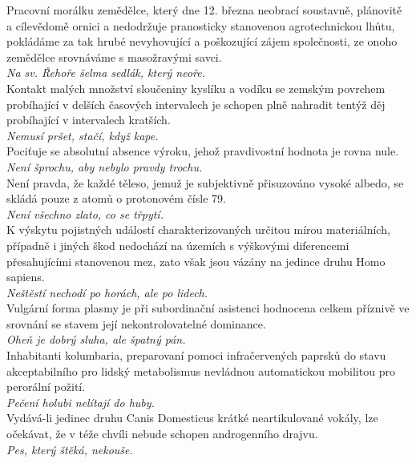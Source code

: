 \begin{multicols}{2}
\noindent
Pracovní morálku zemědělce, který dne 12. března neobrací
soustavně, plánovitě a cílevědomě ornici a nedodržuje pranosticky
stanovenou agrotechnickou lhůtu, pokládáme za tak hrubé nevyhovující
a poškozující zájem společnosti, ze onoho zemědělce srovnáváme
s masožravými savci.\\[1 mm]
{\sl Na sv. Řehoře šelma sedlák, který neoře.}\\

\noindent
Kontakt malých množství sloučeniny kyslíku a vodíku se zemským
povrchem probíhající v delších časových intervalech je schopen
plně nahradit tentýž děj probíhající v intervalech kratších.\\[1 mm]
{\sl Nemusí pršet, stačí, když kape.}\\

\noindent
Pociťuje se absolutní absence výroku, jehož pravdivostní
hodnota je rovna nule.\\[1 mm]
{\sl Není šprochu, aby nebylo pravdy trochu.}\\

\noindent
Není pravda, že každé těleso, jemuž je subjektivně přisuzováno
vysoké albedo, se skládá pouze z atomů o protonovém čísle 79.\\[1 mm]
{\sl Není všechno zlato, co se třpytí.}\\

\noindent
K výskytu pojistných událostí charakterizovaných určitou
mírou materiálních, případně i jiných škod nedochází na územích
s výškovými diferencemi přesahujícími stanovenou mez, zato však
jsou vázány na jedince druhu Homo sapiens.\\[1 mm]
{\sl Neštěstí nechodí po horách, ale po lidech.}\\

\noindent
Vulgární forma plasmy je při subordinační asistenci hodnocena
celkem příznivě ve srovnání se stavem její nekontrolovatelné
dominance.\\[1 mm]
{\sl Oheň je dobrý sluha, ale špatný pán.}\\

\noindent
Inhabitanti kolumbaria, preparovaní pomoci infračervených
paprsků do stavu akceptabilního pro lidský metabolismus nevládnou
automatickou mobilitou pro perorální požití.\\[1 mm]
{\sl Pečení holubi nelítají do huby.}\\

\noindent
Vydává-li jedinec druhu Canis Domesticus krátké neartikulované
vokály, lze očekávat, že v téže chvíli nebude schopen androgenního
drajvu.\\[1 mm]
{\sl Pes, který štěká, nekouše.}\\


\end{multicols}
